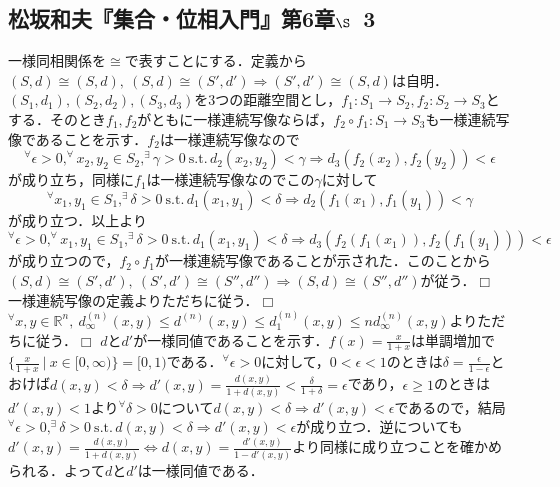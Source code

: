 ﻿\documentclass[11pt,a4paper]{jsarticle}
\newcommand{\st}{\mathrm{s.t.}\,}  %
\def\qed{\hfill $\Box$}
\begin{document}
%
\setlength{\abovedisplayskip}{3pt} %
\setlength{\belowdisplayskip}{3pt} %
%
%
\subsection*{松坂和夫『集合・位相入門』第{6}章$\S${\ }3}
%
\prob
一様同相関係を$\cong$で表すことにする．定義から$(S,d) \cong (S,d),{\ }(S,d) \cong (S',d') \Rightarrow (S',d') \cong (S,d)$は自明．$(S_1,d_1),(S_2,d_2),(S_3,d_3)$を$3$つの距離空間とし，$f_1:S_1 \to S_2,f_2:S_2 \to S_3$とする．そのとき$f_1,f_2$がともに一様連続写像ならば，$f_2 \circ f_1:S_1 \to S_3$も一様連続写像であることを示す．$f_2$は一様連続写像なので
\begin{equation*}
^\forall \epsilon>0, ^\forall x_2,y_2 \in S_2, ^\exists \gamma>0{\ } \st d_2(x_2,y_2)<\gamma \Rightarrow d_3(f_2(x_2),f_2(y_2))<\epsilon
\end{equation*}
が成り立ち，同様に$f_1$は一様連続写像なのでこの$\gamma$に対して
\begin{equation*}
^\forall x_1,y_1 \in S_1, ^\exists \delta>0{\ } \st d_1(x_1,y_1)<\delta \Rightarrow d_2(f_1(x_1),f_1(y_1))<\gamma
\end{equation*}
が成り立つ．以上より
\begin{equation*}
^\forall \epsilon>0, ^\forall x_1,y_1 \in S_1, ^\exists \delta>0{\ } \st d_1(x_1,y_1)<\delta \Rightarrow d_3(f_2(f_1(x_1)),f_2(f_1(y_1)))<\epsilon
\end{equation*}
が成り立つので，$f_2 \circ f_1$が一様連続写像であることが示された．このことから$(S,d) \cong (S',d'),{\ }(S',d') \cong (S'',d'') \Rightarrow (S,d) \cong (S'',d'')$が従う．\qed
%
\prob
一様連続写像の定義よりただちに従う．\qed
%
\prob
$^\forall x,y \in \mathbb{R}^n,{\ }d_{\infty}^{(n)}(x,y) \leq d^{(n)}(x,y) \leq d_{1}^{(n)}(x,y) \leq nd_{\infty}^{(n)}(x,y)$よりただちに従う．\qed
%
\prob
$d$と$d'$が一様同値であることを示す．$f(x)=\frac{x}{1+x}$は単調増加で$\{\frac{x}{1+x} {\ } | {\ }x \in [0,\infty) \}=[0,1)$である．$^\forall \epsilon>0$に対して，$0<\epsilon<1$のときは$\delta=\frac{\epsilon}{1-\epsilon}$とおけば$d(x,y)<\delta \Rightarrow d'(x,y)=\frac{d(x,y)}{1+d(x,y)}<\frac{\delta}{1+\delta}=\epsilon$であり，$\epsilon\geq1$のときは$d'(x,y)<1$より$^\forall \delta>0$について$d(x,y)<\delta \Rightarrow d'(x,y)<\epsilon$であるので，結局$^\forall \epsilon>0, ^\exists \delta>0{\ } \st d(x,y)<\delta \Rightarrow d'(x,y)<\epsilon$が成り立つ．逆についても$d'(x,y)=\frac{d(x,y)}{1+d(x,y)} \Leftrightarrow d(x,y)=\frac{d'(x,y)}{1-d'(x,y)}$より同様に成り立つことを確かめられる．よって$d$と$d'$は一様同値である．
\end{document}
